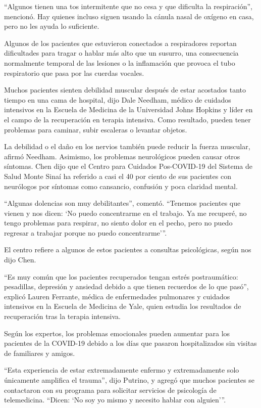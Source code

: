 ``Algunos tienen una tos intermitente que no cesa y que dificulta la
respiración'', mencionó. Hay quienes incluso siguen usando la cánula
nasal de oxígeno en casa, pero no les ayuda lo suficiente.

Algunos de los pacientes que estuvieron conectados a respiradores
reportan dificultades para tragar o hablar más alto que un susurro, una
consecuencia normalmente temporal de las lesiones o la inflamación que
provoca el tubo respiratorio que pasa por las cuerdas vocales.

Muchos pacientes sienten debilidad muscular después de estar acostados
tanto tiempo en una cama de hospital, dijo Dale Needham, médico de
cuidados intensivos en la Escuela de Medicina de la Universidad Johns
Hopkins y líder en el campo de la recuperación en terapia intensiva.
Como resultado, pueden tener problemas para caminar, subir escaleras o
levantar objetos.

La debilidad o el daño en los nervios también puede reducir la fuerza
muscular, afirmó Needham. Asimismo, los problemas neurológicos pueden
causar otros síntomas. Chen dijo que el Centro para Cuidados
Pos-COVID-19 del Sistema de Salud Monte Sinaí ha referido a casi el 40
por ciento de sus pacientes con neurólogos por síntomas como cansancio,
confusión y poca claridad mental.

``Algunas dolencias son muy debilitantes'', comentó. ``Tenemos pacientes
que vienen y nos dicen: `No puedo concentrarme en el trabajo. Ya me
recuperé, no tengo problemas para respirar, no siento dolor en el pecho,
pero no puedo regresar a trabajar porque no puedo concentrarme'''.

El centro refiere a algunos de estos pacientes a consultas psicológicas,
según nos dijo Chen.

``Es muy común que los pacientes recuperados tengan estrés
postraumático: pesadillas, depresión y ansiedad debido a que tienen
recuerdos de lo que pasó'', explicó Lauren Ferrante, médica de
enfermedades pulmonares y cuidados intensivos en la Escuela de Medicina
de Yale, quien estudia los resultados de recuperación tras la terapia
intensiva.

Según los expertos, los problemas emocionales pueden aumentar para los
pacientes de la COVID-19 debido a los días que pasaron hospitalizados
sin visitas de familiares y amigos.

``Esta experiencia de estar extremadamente enfermo y extremadamente solo
únicamente amplifica el trauma'', dijo Putrino, y agregó que muchos
pacientes se contactaron con su programa para solicitar servicios de
psicología de telemedicina. ``Dicen: `No soy yo mismo y necesito hablar
con alguien'''.

